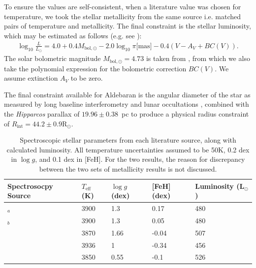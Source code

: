 \documentclass[modern]{aastex61}
\newcommand{\hipparcos}{\emph{Hipparcos}\xspace}
\begin{document}
To ensure the values are self-consistent, when a literature value was chosen for temperature, we took the stellar metallicity from the same source i.e. matched pairs of temperature and metallicity. The final constraint is the stellar luminosity, which may be estimated as follows (e.g. see \citealt{pijpers2003}):
\begin{multline}
\log_{10} \frac{L}{L_{\odot}} = 4.0+
0.4 M_{{\textrm{bol}},\odot} -2.0 \log_{10} {\pi [{\textrm{mas}]}} -0.4(V-A_V + BC(V)).
\label{eqn:lum}
\end{multline}
The solar bolometric magnitude $M_{\textrm{bol},\odot}=4.73$ is taken from \cite{Torres2010}, from which we also take the polynomial expression for the bolometric correction $BC(V)$. We assume extinction $A_V$ to be zero.

The final constraint available for Aldebaran is the angular diameter of the star as measured by long baseline interferometry and lunar occultations \citep[$20.58 \pm 0.03$ mas;][]{richichi2005,1979ApJ...228L.111B,brown1979,panek1980}, combined with the \hipparcos parallax of $19.96 \pm 0.38$~pc to produce a physical radius constraint of $R_{\textrm{int}}=44.2\pm0.9\textrm{R}_{\odot}$.

\begin{table}
	\centering
	\caption{Spectroscopic stellar parameters from each literature source, along with calculated luminosity. All temperature uncertainties assumed to be 50K, 0.2 dex in $\log{g}$, and 0.1 dex in [FeH]. For the two  results, the reason for discrepancy between the two sets of metallicity results is not discussed.}
	\label{tab:spec}
	\begin{tabular}{lllll} %
		\hline
		Spectrosocpy Source & $T_{\textrm{eff}}$ (K) & $\log{g}$ (dex) & [FeH] (dex) & Luminosity (L$_{\odot}$)\\
		\hline
		\cite{2012Sheffield}$_{a}$	&	3900	&	1.3	&	0.17	&	480\\
		\cite{2012Sheffield}$_{b}$	&	3900	&	1.3	&	0.05	&	480\\
		\cite{2011Prugniel}	&	3870 & 1.66 & -0.04 & 507\\
		\cite{2008Massarotti} & 3936 & 1 & -0.34 & 456\\
		\cite{2009Frasca} & 3850 & 0.55 & -0.1 & 526\\
		\hline
	\end{tabular}
\end{table}
\end{document}
